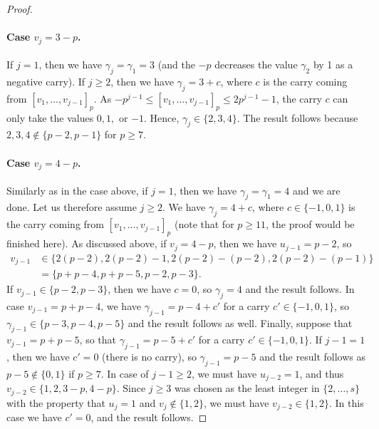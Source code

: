 \documentclass[12pt]{article}
\begin{document}
\begin{proof}
\paragraph{Case $v_{j} = 3 - p$.} If $j = 1$, then we have $\gamma_{j} = \gamma_1 = 3$ (and the $-p$ decreases the value $\gamma_2$ by 1 as a negative carry). If $j \geq 2$, then we have $\gamma_{j} = 3 +c$, where $c$ is the carry coming from $[v_1,\dots, v_{j-1}]_p$. As $-p^{j-1} \leq [v_1,\dots,v_{j-1}]_p \leq 2p^{j-1}-1$, the carry $c$ can only take the values $0,1,$ or $-1$. Hence, $\gamma_{j} \in \{2,3,4\}$. The result follows because $2,3,4 \notin \{p-2,p-1\}$ for $p \ge 7$.

\paragraph{Case $v_{j} = 4-p$.} Similarly as in the case above, if $j = 1$, then we have $\gamma_{j} = \gamma_1 = 4$ and we are done. Let us therefore assume $j \geq 2$. We have $\gamma_{j} = 4 +c$, where $c \in \{-1,0,1\}$ is the carry coming from $[v_1,\dots, v_{j-1}]_p$ (note that for $p \geq 11$, the proof would be finished here). 
As discussed above, if $v_{j} = 4-p$, then we have $u_{j-1} = p-2$, so
\begin{align*}
v_{j-1} &\in \{2(p-2), 2(p-2) - 1, 2(p-2) - (p-2), 2(p-2) - (p-1)\} \\
&= \{p+p-4, p + p-5,p-2, p-3\}.
\end{align*}
If $v_{j-1} \in \{p-2,p-3\}$, then we have $c = 0$, so $\gamma_{j} = 4$ and the result follows. In case $v_{j-1} = p+p-4$, we have $\gamma_{j-1} = p-4+c'$ for a carry $c' \in \{-1,0,1\}$, so $\gamma_{j-1} \in \{p-3,p-4,p-5\}$ and the result follows as well. Finally, suppose that $v_{j-1} = p+p-5$, so that $\gamma_{j-1} = p-5 + c'$ for a carry $c' \in \{-1,0,1\}$. If $j-1 = 1$, then we have $c'= 0$ (there is no carry), so $\gamma_{j-1} = p-5$ and the result follows as $p-5 \notin \{0,1\}$ if $p \geq 7$. In case of $j-1 \geq 2$, we must have $u_{j-2} = 1$, and thus $v_{j-2} \in \{1,2,3-p,4-p\}$. Since $j \ge 3$ was chosen as the least integer in $\{2,\dots,s\}$ with the property that $u_j = 1$ and $v_{j} \notin \{1,2\}$, we must have $v_{j-2} \in \{1,2\}$. In this case we have $c'=0$, and the result follows. 
\end{proof}
\end{document}
